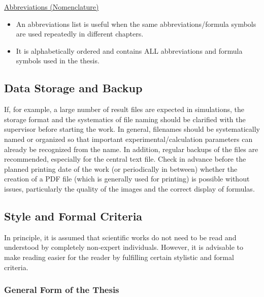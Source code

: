 \documentclass[a4paper, fleqn, headsepline, footsepline, 12pt, parskip=half]{scrartcl}
\begin{document}
\underline{Abbreviations (Nomenclature)}

\begin{itemize}
    \item An abbreviations list is useful when the same abbreviations/formula symbols are used repeatedly in different chapters.
    \item It is alphabetically ordered and contains ALL abbreviations and formula symbols used in the thesis.
\end{itemize}


\subsection{Data Storage and Backup}
\label{sec:dataStorageAndBackup}

If, for example, a large number of result files are expected in simulations, the storage format and the systematics of file naming should be clarified with the supervisor before starting the work. In general, filenames should be systematically named or organized so that important experimental/calculation parameters can already be recognized from the name. In addition, regular backups of the files are recommended, especially for the central text file. Check in advance before the planned printing date of the work (or periodically in between) whether the creation of a PDF file (which is generally used for printing) is possible without issues, particularly the quality of the images and the correct display of formulas.


\subsection{Style and Formal Criteria}
\label{sec:styleAndFormalCriteria}

In principle, it is assumed that scientific works do not need to be read and understood by completely non-expert individuals. However, it is advisable to make reading easier for the reader by fulfilling certain stylistic and formal criteria.


\subsubsection{General Form of the Thesis}
\label{sec:generalFormOfTheThesis}
\end{document}
